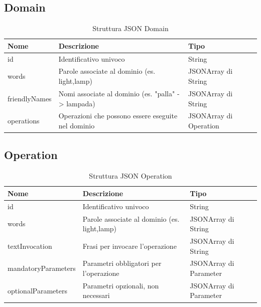 \documentclass[twoside]{supsistudent}
\begin{document}
\subsection{Domain}
\begin{table}[H]
\centering
\caption{Struttura JSON Domain}
\label{Struttura JSON Domain}
\begin{tabular}{@{}|l|l|l|@{}}
\toprule
Nome          & Descrizione                                                                   & Tipo                   \\ \midrule
id            & Identificativo univoco                                                        & String                 \\ \midrule
words         & Parole associate al dominio (es. light,lamp)                         & JSONArray di String    \\ \midrule
friendlyNames & Nomi associate al dominio (es. "palla" -> lampada) & JSONArray di String    \\ \midrule
operations    & Operazioni che possono essere eseguite nel dominio                   & JSONArray di Operation \\ \bottomrule
\end{tabular}
\end{table}

\subsection{Operation}
\begin{table}[H]
\centering
\caption{Struttura JSON Operation}
\label{Struttura JSON Operation}
\begin{tabular}{@{}|l|l|l|@{}}
\toprule
Nome                & Descrizione                                                               & Tipo                   \\ \midrule
id                  & Identificativo univoco                                                    & String                 \\ \midrule
words               & Parole associate al dominio (es. light,lamp)                     & JSONArray di String    \\ \midrule
textInvocation      & Frasi per invocare l'operazione         & JSONArray di String    \\ \midrule
mandatoryParameters & Parametri obbligatori per l'operazione     & JSONArray di Parameter \\ \midrule
optionalParameters  & Parametri opzionali, non necessari & JSONArray di Parameter \\ \bottomrule
\end{tabular}
\end{table}
\end{document}
